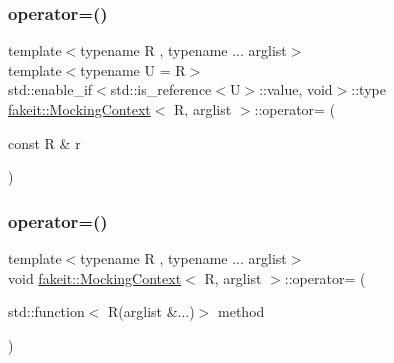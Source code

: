 \subsubsection{\texorpdfstring{operator=()}{operator=()}\hspace{0.1cm}{\footnotesize\ttfamily [12/27]}}
{\footnotesize\ttfamily template$<$typename R , typename ... arglist$>$ \\
template$<$typename U  = R$>$ \\
std\+::enable\+\_\+if$<$std\+::is\+\_\+reference$<$U$>$\+::value, void$>$\+::type \mbox{\hyperlink{classfakeit_1_1MockingContext}{fakeit\+::\+Mocking\+Context}}$<$ R, arglist $>$\+::operator= (\begin{DoxyParamCaption}\item[{const R \&}]{r }\end{DoxyParamCaption})\hspace{0.3cm}{\ttfamily [inline]}}

\mbox{\label{classfakeit_1_1MockingContext_aadefb2bd6c1dee1f3aa8902277dd3fc2}} 
\subsubsection{\texorpdfstring{operator=()}{operator=()}\hspace{0.1cm}{\footnotesize\ttfamily [13/27]}}
{\footnotesize\ttfamily template$<$typename R , typename ... arglist$>$ \\
void \mbox{\hyperlink{classfakeit_1_1MockingContext}{fakeit\+::\+Mocking\+Context}}$<$ R, arglist $>$\+::operator= (\begin{DoxyParamCaption}\item[{std\+::function$<$ R(arglist \&...)$>$}]{method }\end{DoxyParamCaption})\hspace{0.3cm}{\ttfamily [inline]}}

\mbox{\label{classfakeit_1_1MockingContext_adfac3df2408adaa86efec81bd5533a6d}} 
